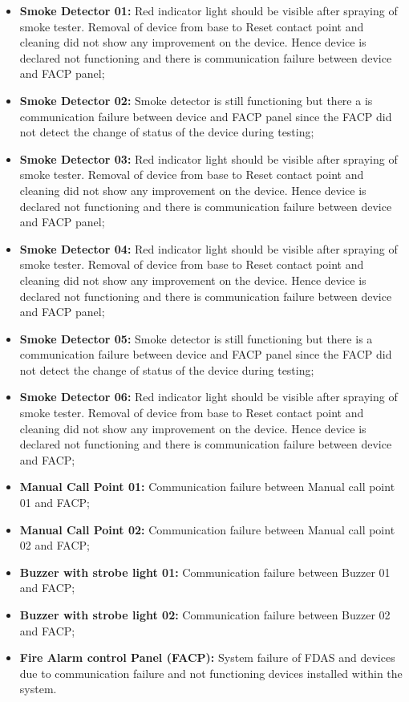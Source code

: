 \begin{itemize}
\item \textbf{Smoke Detector 01:} Red indicator light should be visible after spraying of smoke tester.  Removal of device from base to Reset contact point and cleaning did not show any improvement on the device. Hence device is declared not functioning and there is communication failure between device and FACP panel;
\item \textbf{Smoke Detector 02:} Smoke detector is still functioning but there a   is communication failure between device and FACP panel  since the  FACP did not detect the change of status of the device during testing; 
\item \textbf{Smoke Detector 03:} Red indicator light should be visible after spraying of smoke tester.  Removal of device from base to Reset contact point and cleaning did not show any improvement on the device. Hence device is declared not functioning and there is communication failure between device and FACP panel;
\item \textbf{Smoke Detector 04:} Red indicator light should be visible after spraying of smoke tester.  Removal of device from base to Reset contact point and cleaning did not show any improvement on the device. Hence device is declared not functioning and there is communication failure between device and FACP panel;
\item \textbf{Smoke Detector 05:} Smoke detector is still functioning but there is a communication failure between device and FACP panel  since the  FACP did not detect the change of status of the device during testing;
\item \textbf{Smoke Detector 06:} Red indicator light should be visible after spraying of smoke tester.  Removal of device from base to Reset contact point and cleaning did not show any improvement on the device. Hence device is declared not functioning and there is communication failure between device and FACP;
\item \textbf{Manual Call Point 01:} Communication failure between Manual call point 01 and FACP;
\item \textbf{Manual Call Point 02:} Communication failure between Manual call point 02 and FACP; 
\item \textbf{Buzzer with strobe light 01:} Communication failure between Buzzer  01 and FACP;
\item \textbf{Buzzer with strobe light 02:} Communication failure between Buzzer 02 and FACP;
\item \textbf{Fire Alarm control Panel (FACP):} System failure of FDAS  and devices  due to communication failure and not functioning devices installed within the system.
\end{itemize}




